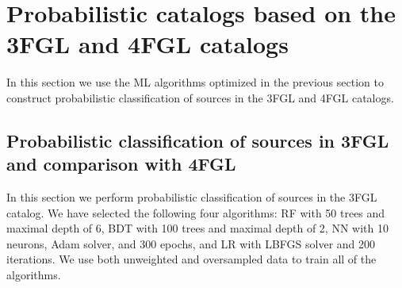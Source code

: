 \section{Probabilistic catalogs based on the 3FGL and 4FGL catalogs}

In this section we use the ML algorithms optimized in the previous section to construct probabilistic
classification of sources in the 3FGL and 4FGL catalogs.


\subsection{Probabilistic classification of sources in 3FGL and comparison with 4FGL}


In this section we perform probabilistic classification of sources in the 3FGL catalog.
We have selected the following four algorithms: RF with 50 trees and maximal depth of 6, BDT with 100 trees and maximal depth of 2, NN with 10 neurons, Adam solver, and 300 epochs, and LR with LBFGS solver and 200 iterations. We use both unweighted and oversampled data to train all of the algorithms.

